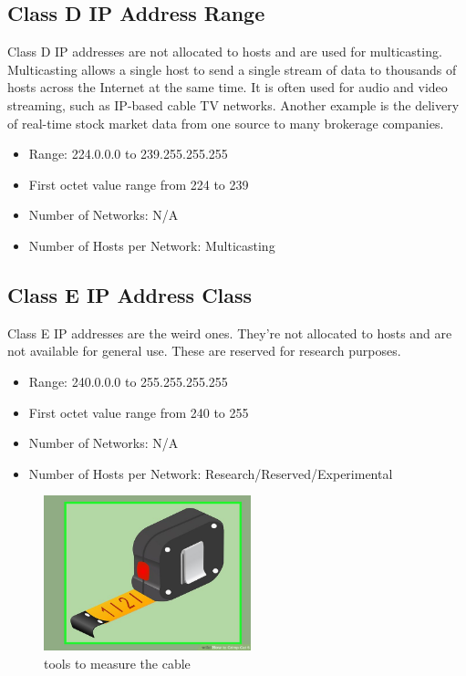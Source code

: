 \documentclass[a4paper,12pt]{book}
\begin{document}
\subsection{Class D IP Address Range}
Class D IP addresses are not allocated to hosts and are used for multicasting. Multicasting allows a single host to send a single stream of data to thousands of hosts across the Internet at the same time. It is often used for audio and video streaming, such as IP-based cable TV networks. Another example is the delivery of real-time stock market data from one source to many brokerage companies.

\begin{itemize}
\item{Range: 224.0.0.0 to 239.255.255.255}
\item{First octet value range from 224 to 239}
\item{Number of Networks: N/A}
\item{Number of Hosts per Network: Multicasting}
\end{itemize}


\subsection{Class E IP Address Class}
Class E IP addresses are the weird ones. They're not allocated to hosts and are not available for general use. These are reserved for research purposes.

\begin{itemize}
\item{Range: 240.0.0.0 to 255.255.255.255}
\item{First octet value range from 240 to 255}
\item{Number of Networks: N/A}
\item{Number of Hosts per Network: Research/Reserved/Experimental}
\end{itemize}

\begin{figure}
\centering
\includegraphics[width= 6cm]{./meter.JPG}
\caption{tools to measure the cable}\label{fig:meter}
\end{figure}
\end{document}
